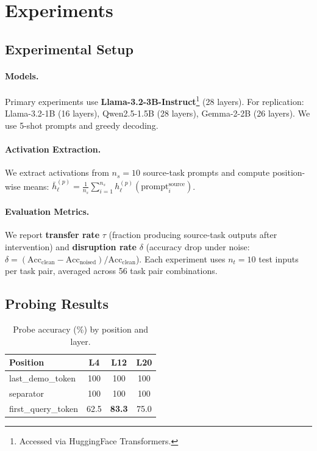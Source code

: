 \documentclass{article}
\begin{document}
\section{Experiments}
\label{sec:experiments}

\subsection{Experimental Setup}

\paragraph{Models.} Primary experiments use \textbf{Llama-3.2-3B-Instruct}\footnote{Accessed via HuggingFace Transformers.} (28 layers). For replication: Llama-3.2-1B (16 layers), Qwen2.5-1.5B \citep{bai2023qwen} (28 layers), Gemma-2-2B \citep{team2024gemma} (26 layers). We use 5-shot prompts and greedy decoding.

\paragraph{Activation Extraction.} We extract activations from $n_s = 10$ source-task prompts and compute position-wise means: $\bar{h}_\ell^{(p)} = \frac{1}{n_s} \sum_{i=1}^{n_s} h_\ell^{(p)}(\text{prompt}_i^{\text{source}})$.

\paragraph{Evaluation Metrics.} We report \textbf{transfer rate} $\tau$ (fraction producing source-task outputs after intervention) and \textbf{disruption rate} $\delta$ (accuracy drop under noise: $\delta = (\text{Acc}_{\text{clean}} - \text{Acc}_{\text{noised}}) / \text{Acc}_{\text{clean}}$). Each experiment uses $n_t = 10$ test inputs per task pair, averaged across 56 task pair combinations.

\subsection{Probing Results}

\begin{table}
\vspace{-12pt}
\centering
\small
\caption{Probe accuracy (\%) by position and layer.}
\label{tab:probing}
\begin{tabular}{@{}lccc@{}}
\toprule
Position & L4 & L12 & L20 \\
\midrule
last\_demo\_token & 100 & 100 & 100 \\
separator & 100 & 100 & 100 \\
first\_query\_token & 62.5 & \textbf{83.3} & 75.0 \\
\bottomrule
\end{tabular}
\vspace{-10pt}
\end{table}
\end{document}
